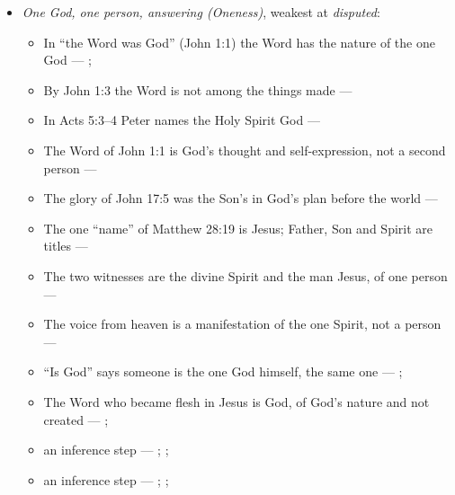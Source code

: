 \documentclass[11pt,paper=\testimonypaper,DIV=13,parskip=false]{scrartcl}
\begin{document}
\begin{itemize}
\item \emph{One God, one person, answering (Oneness)}, weakest at \emph{disputed}:
\begin{itemize}
\item In “the Word was God” (John 1:1) the Word has the nature of the one God --- \cite{harner-qualitative-anarthrous-1973}; \cite[3, The Triune God]{kibbey-living-systematic-theology-2026}
\item By John 1:3 the Word is not among the things made --- \cite[Tractates on John I.11]{schaff-nicene-post-nicene-fathers-1-7}
\item In Acts 5:3–4 Peter names the Holy Spirit God --- \cite[198]{calvin-commentary-acts-1844}
\item The Word of John 1:1 is God’s thought and self-expression, not a second person --- \cite[ch. 4 and 8, on John 1:1]{bernard-oneness-of-god-1983}
\item The glory of John 17:5 was the Son’s in God’s plan before the world --- \cite[ch. 8, The Preexistence of Jesus]{bernard-oneness-of-god-1983}
\item The one “name” of Matthew 28:19 is Jesus; Father, Son and Spirit are titles --- \cite[ch. 6, Matthew 28:19]{bernard-oneness-of-god-1983}
\item The two witnesses are the divine Spirit and the man Jesus, of one person --- \cite[ch. 8, Two Witnesses]{bernard-oneness-of-god-1983}
\item The voice from heaven is a manifestation of the one Spirit, not a person --- \cite[ch. 8, The Voice from Heaven]{bernard-oneness-of-god-1983}
\item “Is God” says someone is the one God himself, the same one --- \cite[ch. 8, Are Jesus and the Father One in Purpose Only?]{bernard-oneness-of-god-1983}; \cite[27]{watchtower-should-you-believe-trinity-1989}
\item The Word who became flesh in Jesus is God, of God’s nature and not created --- \cite[3, The Triune God]{kibbey-living-systematic-theology-2026}; \cite[ch. 4, Conclusion]{bernard-oneness-of-god-1983}
\item an inference step --- \cite[3, The Triune God]{kibbey-living-systematic-theology-2026}; \cite[ch. 4, Conclusion]{bernard-oneness-of-god-1983}; \cite[17--19]{buzzard-caveat-lector-2001}
\item an inference step --- \cite[ch. 8, Are Jesus and the Father One in Purpose Only?]{bernard-oneness-of-god-1983}; \cite[27]{watchtower-should-you-believe-trinity-1989}; \cite[I, q. 28, a. 3]{aquinas-summa-1920}

\end{itemize}
\end{itemize}
\end{document}
